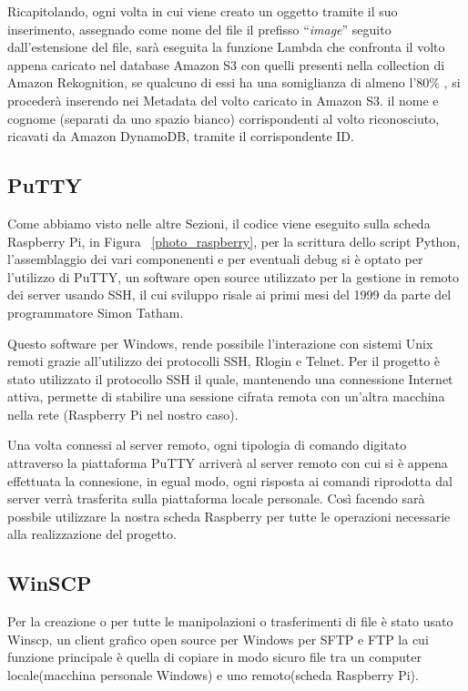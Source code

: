 Ricapitolando, ogni volta in cui viene creato un oggetto tramite il suo inserimento, assegnado come nome del file il prefisso ``\textsl{image}'' seguito dall'estensione del 
file, sarà eseguita la funzione Lambda che confronta il volto appena caricato nel database Amazon S3 con quelli presenti nella collection di Amazon Rekognition, se 
qualcuno di essi ha una somiglianza di almeno l'80\% , si procederà inserendo nei Metadata del volto caricato in Amazon S3. il nome e cognome (separati da uno spazio bianco)
corrispondenti al volto riconosciuto, ricavati da Amazon DynamoDB, tramite il corrispondente ID.

\subsection{PuTTY}
Come abbiamo visto nelle altre Sezioni, il codice viene eseguito sulla scheda Raspberry Pi, in Figura ~\ref{photo_raspberry}, per la scrittura dello script Python, 
l'assemblaggio dei vari componenenti e per eventuali debug si è optato per l'utilizzo di PuTTY, un software open source utilizzato per la gestione in remoto dei server 
usando SSH, il cui sviluppo risale ai primi mesi del 1999 da parte del programmatore Simon Tatham.

Questo software per Windows, rende possibile l’interazione con sistemi Unix remoti grazie all’utilizzo dei protocolli SSH, Rlogin e Telnet. Per il progetto è stato
utilizzato il protocollo SSH il quale, mantenendo una connessione Internet attiva, permette di stabilire una sessione cifrata remota con un'altra macchina 
nella rete (Raspberry Pi nel nostro caso).

Una volta connessi al server remoto, ogni tipologia di comando digitato attraverso la piattaforma PuTTY arriverà al server remoto con cui si è appena effettuata
la connesione, in egual modo, ogni risposta ai comandi riprodotta dal server verrà trasferita sulla piattaforma locale personale. Così facendo sarà possbile 
utilizzare la nostra scheda Raspberry per tutte le operazioni necessarie alla realizzazione del progetto.

\subsection{WinSCP}
Per la creazione o per tutte le manipolazioni o trasferimenti di file è stato usato Winscp, un client grafico open source per Windows per SFTP e FTP la cui funzione
principale è quella di copiare in modo sicuro file tra un computer locale(macchina personale Windows) e uno remoto(scheda Raspberry Pi).

